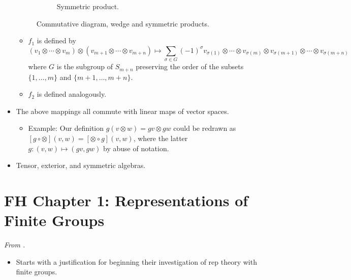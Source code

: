 \documentclass[../notes.tex]{subfiles}
\begin{document}
\begin{itemize}
\begin{figure}[h!]
\begin{subfigure}[b]{0.35\linewidth}
            \vspace{-1.5em}
            \caption{Symmetric product.}
            \label{fig:CDwedgeSymb}
        \end{subfigure}
        \EnableQuotes
        \caption{Commutative diagram, wedge and symmetric products.}
        \label{fig:CDwedgeSym}
    \end{figure}
    \begin{itemize}
        \item $f_1$ is defined by
        \begin{equation*}
            (v_1\otimes\cdots\otimes v_m)\otimes(v_{m+1}\otimes\cdots\otimes v_{m+n}) \mapsto \sum_{\sigma\in G}(-1)^\sigma v_{\sigma(1)}\otimes\cdots\otimes v_{\sigma(m)}\otimes v_{\sigma(m+1)}\otimes\cdots\otimes v_{\sigma(m+n)}
        \end{equation*}
        where $G$ is the subgroup of $S_{m+n}$ preserving the order of the subsets $\{1,\dots,m\}$ and $\{m+1,\dots,m+n\}$.
        \item $f_2$ is defined analogously.
    \end{itemize}
    \item The above mappings all commute with linear maps of vector spaces.
    \begin{itemize}
        \item Example: Our definition $g(v\otimes w)=gv\otimes gw$ could be redrawn as $[g\circ\otimes](v,w)=[\otimes\circ g](v,w)$, where the latter $g:(v,w)\mapsto(gv,gw)$ by abuse of notation.
    \end{itemize}
    \item Tensor, exterior, and symmetric algebras.
\end{itemize}



\section{FH Chapter 1: Representations of Finite Groups}
\emph{From \textcite{bib:FultonHarris}.}
\begin{itemize}
    \item {}Starts with a justification for beginning their investigation of rep theory with finite groups.
\end{itemize}
\end{document}
